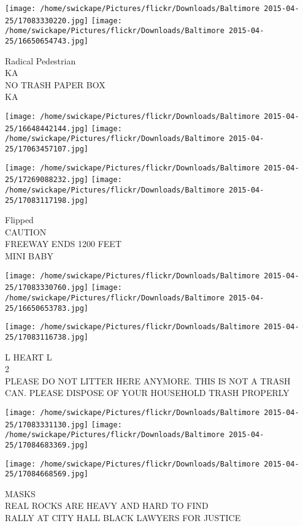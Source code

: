 \documentclass[10pt,letterpaper]{article}
\begin{document}
\texttt{[image: /home/swickape/Pictures/flickr/Downloads/Baltimore 2015-04-25/17083330220.jpg]}
\texttt{[image: /home/swickape/Pictures/flickr/Downloads/Baltimore 2015-04-25/16650654743.jpg]}

Radical Pedestrian\\
KA\\
NO TRASH PAPER BOX\\
KA\\
\pagebreak

\texttt{[image: /home/swickape/Pictures/flickr/Downloads/Baltimore 2015-04-25/16648442144.jpg]}
\texttt{[image: /home/swickape/Pictures/flickr/Downloads/Baltimore 2015-04-25/17063457107.jpg]}

\texttt{[image: /home/swickape/Pictures/flickr/Downloads/Baltimore 2015-04-25/17269088232.jpg]}
\texttt{[image: /home/swickape/Pictures/flickr/Downloads/Baltimore 2015-04-25/17083117198.jpg]}

Flipped\\
CAUTION\\
FREEWAY ENDS 1200 FEET\\
MINI BABY\\
\pagebreak

\texttt{[image: /home/swickape/Pictures/flickr/Downloads/Baltimore 2015-04-25/17083330760.jpg]}
\texttt{[image: /home/swickape/Pictures/flickr/Downloads/Baltimore 2015-04-25/16650653783.jpg]}

\vspace{0.25in}
\texttt{[image: /home/swickape/Pictures/flickr/Downloads/Baltimore 2015-04-25/17083116738.jpg]}

L HEART L\\
2\\
PLEASE DO NOT LITTER HERE ANYMORE.  THIS IS NOT A TRASH CAN.  PLEASE DISPOSE OF YOUR HOUSEHOLD TRASH PROPERLY\\
\pagebreak

\texttt{[image: /home/swickape/Pictures/flickr/Downloads/Baltimore 2015-04-25/17083331130.jpg]}
\texttt{[image: /home/swickape/Pictures/flickr/Downloads/Baltimore 2015-04-25/17084683369.jpg]}

\vspace{0.25in}
\texttt{[image: /home/swickape/Pictures/flickr/Downloads/Baltimore 2015-04-25/17084668569.jpg]}

MASKS\\
REAL ROCKS ARE HEAVY AND HARD TO FIND\\
RALLY AT CITY HALL BLACK LAWYERS FOR JUSTICE\\
\pagebreak
\end{document}
